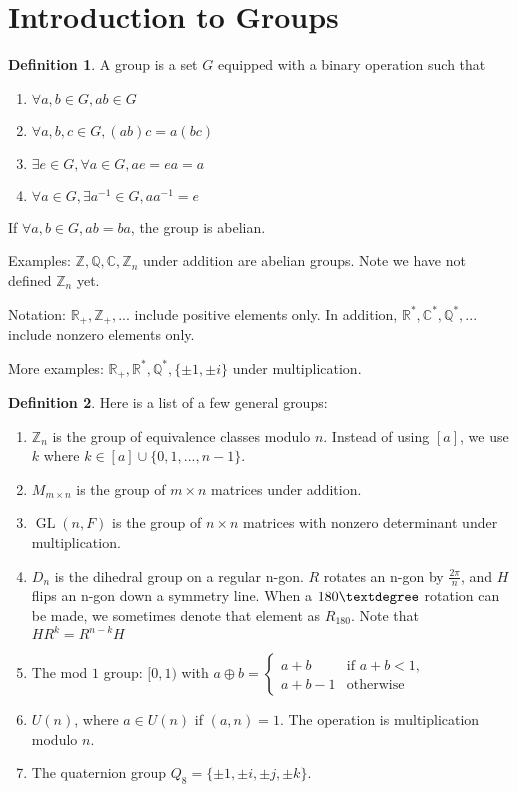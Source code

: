 \documentclass{article}
\theoremstyle{definition}
\newtheorem{definition}{Definition}
\theoremstyle{plain}
\theoremstyle{corollary}
\theoremstyle{lemma}
\DeclareMathOperator{\GL}{GL}
\begin{document}
\section{Introduction to Groups}

\begin{definition}
A group is a set $G$ equipped with a binary operation such that
\begin{enumerate}
    \item $\forall a,b\in G, ab\in G$
    \item $\forall a,b,c \in G, (ab)c=a(bc)$
    \item $\exists e\in G,\forall a\in G,ae=ea=a$
    \item $\forall a\in G,\exists a^{-1}\in G,aa^{-1}=e$
\end{enumerate}
If $\forall a,b\in G,ab=ba$, the group is abelian.
\end{definition}

Examples: $\mathbb{Z},\mathbb{Q},\mathbb{C},\mathbb{Z}_n$ under addition are abelian groups. Note we have not defined $\mathbb{Z}_n$ yet.

Notation: $\mathbb{R}_+,\mathbb{Z}_+,...$ include positive elements only. In addition, $\mathbb{R}^*,\mathbb{C}^*,\mathbb{Q}^*,...$ include nonzero elements only.

More examples: $\mathbb{R}_+,\mathbb{R}^*,\mathbb{Q}^*,\{\pm 1,\pm i\}$ under multiplication.

\begin{definition}
Here is a list of a few general groups:
\begin{enumerate}
    \item $\mathbb{Z}_n$ is the group of equivalence classes modulo $n$. Instead of using $[a]$, we use $k$ where $k\in[a]\cup\{0,1,...,n-1\}$.
    \item $M_{m\times n}$ is the group of $m\times n$ matrices under addition.
    \item $\GL(n,F)$ is the group of $n\times n$ matrices with nonzero determinant under multiplication.
    \item $D_n$ is the dihedral group on a regular n-gon. $R$ rotates an n-gon by $\frac{2\pi}{n}$, and $H$ flips an n-gon down a symmetry line. When a $180\textdegree$ rotation can be made, we sometimes denote that element as $R_{180}$. Note that $HR^k=R^{n-k}H$
    \item The mod $1$ group: $[0,1)$ with $a\oplus b = 
    \begin{cases}
        a+b & \text{if } a+b < 1,\\
        a+b-1  & \text{otherwise}
    \end{cases}$
    \item $U(n)$, where $a\in U(n)$ if $(a,n)=1$. The operation is multiplication modulo $n$.
    \item The quaternion group $Q_8=\{\pm1,\pm i,\pm j,\pm k\}$.
\end{enumerate}
\end{definition}
\end{document}
